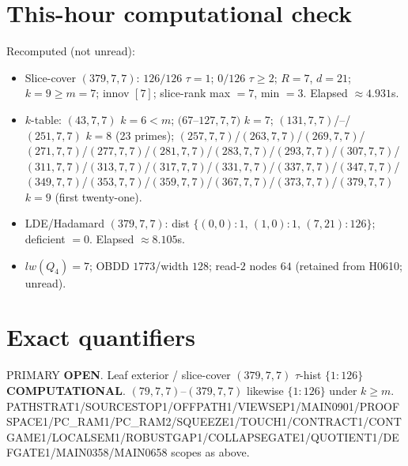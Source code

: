 \documentclass[11pt]{article}
\begin{document}
\section*{This-hour computational check}
Recomputed (not unread):
\begin{itemize}
\item Slice-cover $(379,7,7)$: $126/126$ $\tau{=}1$; $0/126$ $\tau{\ge}2$; $R{=}7$, $d{=}21$;
  $k{=}9{\ge}m{=}7$; innov $[7]$; slice-rank max $=7$, min $=3$. Elapsed $\approx4.931$s.
\item $k$-table: $(43,7,7)$ $k{=}6{<}m$; $(67$--$127,7,7)$ $k{=}7$;
  $(131,7,7)$/--/$(251,7,7)$ $k{=}8$ (23 primes); $(257,7,7)$/$(263,7,7)$/$(269,7,7)$/$(271,7,7)$/$(277,7,7)$/$(281,7,7)$/$(283,7,7)$/$(293,7,7)$/$(307,7,7)$/$(311,7,7)$/$(313,7,7)$/$(317,7,7)$/$(331,7,7)$/$(337,7,7)$/$(347,7,7)$/$(349,7,7)$/$(353,7,7)$/$(359,7,7)$/$(367,7,7)$/$(373,7,7)$/$(379,7,7)$ $k{=}9$ (first twenty-one).
\item LDE/Hadamard $(379,7,7)$: dist $\{(0,0){:}1,\,(1,0){:}1,\,(7,21){:}126\}$; deficient $=0$. Elapsed $\approx8.105$s.
\item $lw(Q_4)=7$; OBDD $1773$/width $128$; read-$2$ nodes $64$ (retained from H0610; unread).
\end{itemize}

\section*{Exact quantifiers}
PRIMARY \textbf{OPEN}. Leaf exterior / slice-cover $(379,7,7)$ $\tau$-hist $\{1{:}126\}$ \textbf{COMPUTATIONAL}.
$(79,7,7)$--$(379,7,7)$ likewise $\{1{:}126\}$ under $k{\ge}m$.
PATHSTRAT1/SOURCESTOP1/OFFPATH1/VIEWSEP1/MAIN0901/PROOFSPACE1/PC\_RAM1/PC\_RAM2/SQUEEZE1/TOUCH1/CONTRACT1/CONTGAME1/LOCALSEM1/ROBUSTGAP1/COLLAPSEGATE1/QUOTIENT1/DEFGATE1/MAIN0358/MAIN0658 scopes as above.
\end{document}
